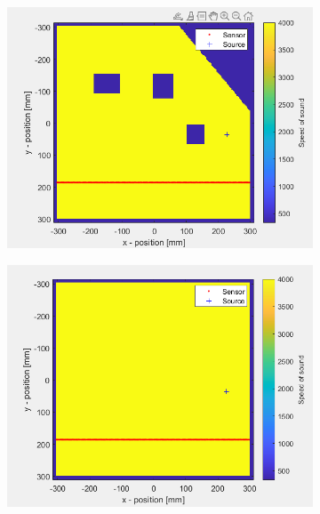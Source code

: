 \documentclass[conference]{IEEEtran}
\begin{document}
\begin{figure}[H]
\begin{subfigure}{.155\textwidth}
    \caption{}
    \label{fig:sfig2}
  \end{subfigure}
  \begin{subfigure}{.155\textwidth}
    \centering
    \includegraphics[width=.95\linewidth]{forme3.png}
    \caption{}
    \label{fig:sfig3}
  \end{subfigure}
  \begin{subfigure}{.155\textwidth}
    \centering
    \includegraphics[width=.95\linewidth]{forme4.png}
    \caption{}
    \label{fig:sfig4}
  \end{subfigure}
  \begin{subfigure}{.155\textwidth}
    \centering

\end{subfigure}
\end{figure}
\end{document}
